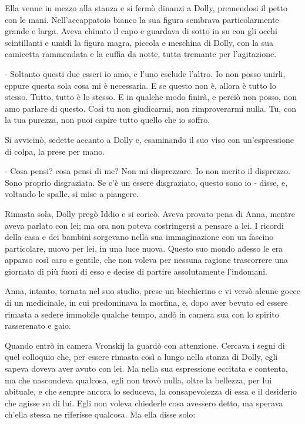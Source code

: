 Ella venne in mezzo alla stanza e si fermò dinanzi a Dolly, premendosi il petto con le mani. Nell'accappatoio bianco la sua figura sembrava particolarmente grande e larga. Aveva chinato il capo e guardava di sotto in su con gli occhi scintillanti e umidi la figura magra, piccola e meschina di Dolly, con la sua camicetta rammendata e la cuffia da notte, tutta tremante per l'agitazione. 

- Soltanto questi due esseri io amo, e l'uno esclude l'altro. Io non posso unirli, eppure questa sola cosa mi è necessaria. E se questo non è, allora è tutto lo stesso. Tutto, tutto è lo stesso. E in qualche modo finirà, e perciò non posso, non amo parlare di questo. Così tu non giudicarmi, non rimproverarmi nulla. Tu, con la tua purezza, non puoi capire tutto quello che io soffro. 

Si avvicinò, sedette accanto a Dolly e, esaminando il suo viso con un'espressione di colpa, la prese per mano. 

- Cosa pensi? cosa pensi di me? Non mi disprezzare. Io non merito il disprezzo. Sono proprio disgraziata. Se c'è un essere disgraziato, questo sono io - disse, e, voltando le spalle, si mise a piangere. 

Rimasta sola, Dolly pregò Iddio e si coricò. Aveva provato pena di Anna, mentre aveva parlato con lei; ma ora non poteva costringersi a pensare a lei. I ricordi della casa e dei bambini sorgevano nella sua immaginazione con un fascino particolare, nuovo per lei, in una luce nuova. Questo suo mondo adesso le era apparso così caro e gentile, che non voleva per nessuna ragione trascorrere una giornata di più fuori di esso e decise di partire assolutamente l'indomani. 

Anna, intanto, tornata nel suo studio, prese un bicchierino e vi versò alcune gocce di un medicinale, in cui predominava la morfina, e, dopo aver bevuto ed essere rimasta a sedere immobile qualche tempo, andò in camera sua con lo spirito rasserenato e gaio. 

Quando entrò in camera Vronskij la guardò con attenzione. Cercava i segni di quel colloquio che, per essere rimasta così a lungo nella stanza di Dolly, egli sapeva doveva aver avuto con lei. Ma nella sua espressione eccitata e contenta, ma che nascondeva qualcosa, egli non trovò nulla, oltre la bellezza, per lui abituale, e che sempre ancora lo seduceva, la consapevolezza di essa e il desiderio che agisse su di lui. Egli non voleva chiederle cosa avessero detto, ma sperava ch'ella stessa ne riferisse qualcosa. Ma ella disse solo: 

